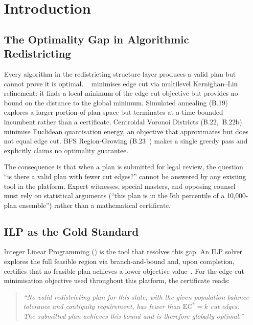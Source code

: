 \section{Introduction}
\label{sec:introduction}

\subsection{The Optimality Gap in Algorithmic Redistricting}

Every algorithm in the redistricting structure layer produces a valid plan
but cannot prove it is optimal.
\metis{}~\citep{karypis1998} minimises edge cut via multilevel
Kernighan--Lin refinement: it finds a local minimum of the edge-cut objective
but provides no bound on the distance to the global minimum.
Simulated annealing (B.19) explores a larger portion of plan space but
terminates at a time-bounded incumbent rather than a certificate.
Centroidal Voronoi Districts (B.22,~B.22b) minimise Euclidean quantisation
energy, an objective that approximates but does not equal edge cut.
BFS Region-Growing (B.23~\citep{dellaLibera2026bfsgrowth}) makes a single
greedy pass and explicitly claims no optimality guarantee.

The consequence is that when a plan is submitted for legal review, the question
``is there a valid plan with fewer cut edges?'' cannot be answered by any
existing tool in the platform.
Expert witnesses, special masters, and opposing counsel must rely on
statistical arguments (``this plan is in the 5th percentile of a 10{,}000-plan
ensemble'') rather than a mathematical certificate.

\subsection{ILP as the Gold Standard}

Integer Linear Programming (\ilp{}) is the tool that resolves this gap.
An ILP solver explores the full feasible region via branch-and-bound
and, upon completion, certifies that no feasible plan achieves a lower
objective value~\citep{nemhauser1988}.
For the edge-cut minimisation objective used throughout this platform,
the certificate reads:

\begin{quote}
\textit{``No valid redistricting plan for this state, with the given
population balance tolerance and contiguity requirement, has fewer
than $\mathrm{EC}^* = k$ cut edges. The submitted plan achieves this
bound and is therefore globally optimal.''}
\end{quote}

